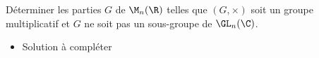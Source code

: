 \begin{enonce}
\begin{exercise}[ID={RMS134 E570},subtitle={Oral
    Mines-Ponts},theme={algebre},annee={2023},concours={mines-ponts},filiere={MP}]
Déterminer les parties $G$ de $\M_n(\R)$ telles que $(G,\times)$ soit
un groupe multiplicatif et $G$ ne soit pas un sous-groupe de $\GL_n(\C)$.
\end{exercise}
\begin{solution}
  \begin{itemize}
  \item Solution à compléter
  \end{itemize}
\end{solution}
\end{enonce}